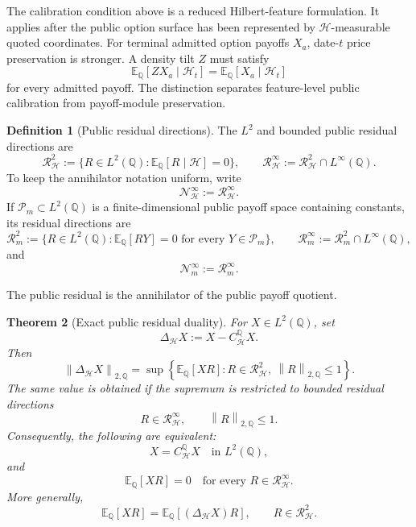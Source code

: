 \documentclass[11pt,a4paper]{amsart}
\theoremstyle{plain}
\newtheorem{theorem}{Theorem}[section]
\theoremstyle{definition}
\newtheorem{definition}[theorem]{Definition}
\theoremstyle{remark}
\newcommand{\QQ}{\mathbb{Q}}
\newcommand{\EE}{\mathbb{E}}
\newcommand{\cH}{\mathcal{H}}
\newcommand{\cN}{\mathcal{N}}
\newcommand{\cP}{\mathcal{P}}
\newcommand{\cR}{\mathcal{R}}
\newcommand{\norm}[1]{\left\lVert #1\right\rVert}
\begin{document}
The calibration condition above is a reduced Hilbert-feature formulation.  It applies after the
public option surface has been represented by \(\cH\)-measurable quoted coordinates.  For terminal
admitted option payoffs \(X_a\), date-\(t\) price preservation is stronger.  A density tilt
\(Z\) must satisfy
\[
        \EE_\QQ[ZX_a\mid \cH_t]
        =
        \EE_\QQ[X_a\mid \cH_t]
\]
for every admitted payoff.  The distinction separates feature-level public calibration from
payoff-module preservation.

\begin{definition}[Public residual directions]\label{def:public-residual-directions}
The \(L^2\) and bounded public residual directions are
\[
        \cR_{\cH}^{2}
        :=
        \{R\in L^2(\QQ):\EE_\QQ[R\mid\cH]=0\},
        \qquad
        \cR_{\cH}^{\infty}
        :=
        \cR_{\cH}^{2}\cap L^\infty(\QQ).
\]
To keep the annihilator notation uniform, write
\[
        \cN_{\cH}^{\infty}
        :=
        \cR_{\cH}^{\infty}.
\]
If \(\cP_m\subset L^2(\QQ)\) is a finite-dimensional public payoff space containing constants, its
residual directions are
\[
        \cR_m^2
        :=
        \{R\in L^2(\QQ):\EE_\QQ[RY]=0\text{ for every }Y\in\cP_m\},
        \qquad
        \cR_m^\infty:=\cR_m^2\cap L^\infty(\QQ),
\]
and
\[
        \cN_m^{\infty}
        :=
        \cR_m^\infty.
\]
\end{definition}

The public residual is the annihilator of the public payoff quotient.

\begin{theorem}[Exact public residual duality]\label{thm:public-annihilator}
For \(X\in L^2(\QQ)\), set
\[
        \Delta_{\cH}X:=X-C_{\cH}^{\QQ}X.
\]
Then
\[
        \norm{\Delta_{\cH}X}_{2,\QQ}
        =
        \sup\left\{
        \EE_\QQ[XR]:
        R\in\cR_{\cH}^{2},\ \norm{R}_{2,\QQ}\le1
        \right\}.
\]
The same value is obtained if the supremum is restricted to bounded residual directions
\[
        R\in\cR_{\cH}^{\infty},
        \qquad
        \norm{R}_{2,\QQ}\le1.
\]
Consequently, the following are equivalent:
\[
        X=C_{\cH}^{\QQ}X
        \quad\text{in }L^2(\QQ),
\]
and
\[
        \EE_\QQ[XR]=0
        \quad\text{for every }R\in\cR_{\cH}^{\infty}.
\]
More generally,
\[
        \EE_\QQ[XR]=\EE_\QQ[(\Delta_{\cH}X)R],
        \qquad R\in\cR_{\cH}^{2}.
\]
\end{theorem}
\end{document}
